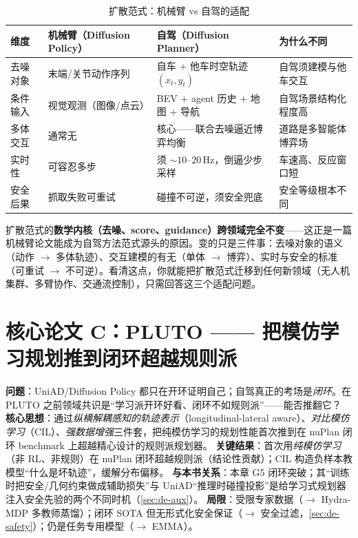 \begin{table}[H]\centering\small
\caption{扩散范式：机械臂 vs 自驾的适配}
\label{tab:de-arm-vs-av}
\begin{tabular}{p{} p{} p{} p{}}
\toprule
维度 & 机械臂（Diffusion Policy） & 自驾（Diffusion Planner） & 为什么不同 \\
\midrule
去噪对象 & 末端/关节动作序列 & 自车 $+$ 他车时空轨迹 $(x_t,y_t)$ & 自驾须建模与他车交互 \\
条件输入 & 视觉观测（图像/点云） & BEV $+$ agent 历史 $+$ 地图 $+$ 导航 & 自驾场景结构化程度高 \\
多体交互 & 通常无 & 核心——联合去噪逼近博弈均衡 & 道路是多智能体博弈场 \\
实时性 & 可容忍多步 & 须 $\sim 10$--$20$\,Hz，倒逼少步采样 & 车速高、反应窗口短 \\
安全后果 & 抓取失败可重试 & 碰撞不可逆，须安全兜底 & 安全等级根本不同 \\
\bottomrule
\end{tabular}
\end{table}

\begin{insight}
扩散范式的\textbf{数学内核（去噪、score、guidance）跨领域完全不变}——这正是一篇机械臂论文能成为自驾方法范式源头的原因。变的只是三件事：去噪对象的语义（动作 $\to$ 多体轨迹）、交互建模的有无（单体 $\to$ 博弈）、实时与安全的标准（可重试 $\to$ 不可逆）。看清这点，你就能把扩散范式迁移到任何新领域（无人机集群、多臂协作、交通流控制），只需回答这三个适配问题。
\end{insight}

\section{核心论文 C：PLUTO —— 把模仿学习规划推到闭环超越规则派}
\label{sec:de-pluto}

\begin{paper}\label{paper:de-pluto}
\textbf{问题}：UniAD/Diffusion Policy 都只在开环证明自己；自驾真正的考场是\emph{闭环}。在 PLUTO 之前领域共识是“学习派开环好看、闭环不如规则派”——能否推翻它？
\textbf{核心思想}\cite{cheng2024pluto}：通过\emph{纵横解耦感知的轨迹表示}（longitudinal-lateral aware）、\emph{对比模仿学习}（CIL）、\emph{强数据增强}三件套，把纯模仿学习的规划性能首次推到在 nuPlan 闭环 benchmark 上超越精心设计的规则派规划器。
\textbf{关键结果}：首次用\emph{纯模仿学习}（非 RL、非规则）在 nuPlan 闭环超越规则派（结论性贡献）；CIL 构造负样本教模型“什么是坏轨迹”，缓解分布偏移。
\textbf{与本书关系}：本章 G5 闭环突破；其“训练时把安全/几何约束做成辅助损失”与 UniAD“推理时碰撞投影”是给学习式规划器注入安全先验的两个不同时机（\cref{sec:de-aux}）。
\textbf{局限}：受限专家数据（$\to$ Hydra-MDP 多教师蒸馏）；闭环 SOTA 但无形式化安全保证（$\to$ 安全过滤，\cref{sec:de-safety}）；仍是任务专用模型（$\to$ EMMA）。
\end{paper}

